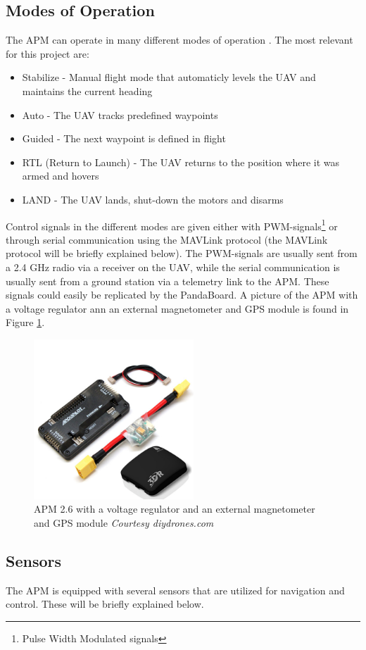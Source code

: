\subsection{Modes of Operation}
The APM can operate in many different modes of operation \citep{flight}. The most relevant for this project are:
\begin{itemize}
\item Stabilize - Manual flight mode that automaticly levels the  UAV and maintains the current heading
\item Auto - The UAV tracks predefined waypoints
\item Guided - The next waypoint is defined in flight
\item RTL (Return to Launch) - The UAV returns to the position where it was armed and hovers
\item LAND - The UAV lands, shut-down the motors and disarms
\end{itemize}
Control signals in the different modes are given either with PWM-signals\footnote{Pulse Width Modulated signals} or through serial communication using the MAVLink protocol (the MAVLink protocol will be briefly explained below). The PWM-signals are usually sent from a 2.4 GHz radio via a receiver on the UAV, while the serial communication is usually sent from a ground station via a telemetry link to the APM. These signals could easily be replicated by the PandaBoard. A picture of the APM with a voltage regulator ann an external magnetometer and GPS module is found in Figure \ref{apm}.
\begin{figure}[H]
\centering
\includegraphics[width = 6cm]{fig/apm25.jpg}
\caption{APM 2.6 with a voltage regulator and an external magnetometer and GPS module \textit{Courtesy diydrones.com}}
\label{apm}
\end{figure}
\subsection{Sensors}
The APM is equipped with several sensors that are utilized for navigation and control. These will be briefly explained below.
